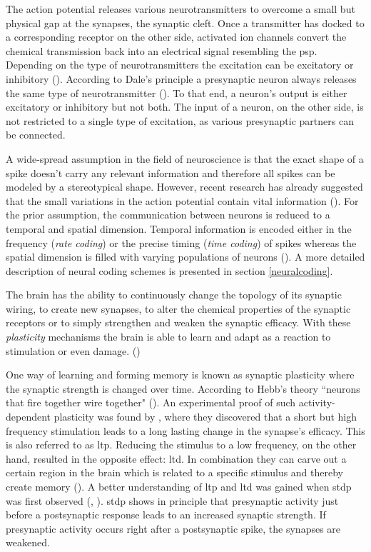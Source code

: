 
The action potential releases various neurotransmitters to overcome a small but physical gap at the synapses, the synaptic cleft. Once a transmitter has docked to a corresponding receptor on the other side, activated ion channels convert the chemical transmission back into an electrical signal resembling the \gls{psp}. Depending on the type of neuro\-transmitters the excitation can be excitatory or inhibitory (\citealp{gerstner2014dynamics}). According to Dale's principle a presynaptic neuron always releases the same type of neurotransmitter (\citealp{dale1935pharmacology}). To that end, a neuron's output is either excitatory or inhibitory but not both. The input of a neuron, on the other side, is not restricted to a single type of excitation, as various presynaptic partners can be connected. 

A wide-spread assumption in the field of neuroscience is that the exact shape of a spike doesn't carry any relevant information and therefore all spikes can be modeled by a stereotypical shape. However, recent research has already suggested that the small variations in the action potential contain vital information (\citealp{debanne2013mechanisms}). For the prior assumption, the communication between neurons is reduced to a temporal and spatial dimension. Temporal information is encoded either in the frequency (\emph{rate coding}) or the precise timing (\emph{time coding}) of spikes whereas the spatial dimension is filled with varying populations of neurons (\citealp{gerstner2014dynamics}). A more detailed description of neural coding schemes is presented in section \ref{neuralcoding}.

The brain has the ability to continuously change the topology of its synaptic wiring, to create new synapses, to alter the chemical properties of the synaptic receptors or to simply strengthen and weaken the synaptic efficacy. With these \emph{plasticity} mechanisms the brain is able to learn and adapt as a reaction to stimulation or even damage. (\citealp{gerstner2014dynamics})

One way of learning and forming memory is known as synaptic plasticity where the synaptic strength is changed over time. According to Hebb's theory ``neurons that fire together wire together" (\citealp{hebb1949organization}). An experimental proof of such activity-dependent plasticity was found by \cite{bliss1973long}, where they discovered that a short but high frequency stimulation leads to a long lasting change in the synapse's efficacy. This is also referred to as \gls{ltp}. Reducing the stimulus to a low frequency, on the other hand, resulted in the opposite effect: \gls{ltd}. In combination they can carve out a certain region in the brain which is related to a specific stimulus and thereby create memory (\citealp{nabavi2014engineering}). A better understanding of \gls{ltp} and \gls{ltd} was gained when \gls{stdp} was first observed (\citealp{markram1997regulation}, \citealp{poo98stdp}). \gls{stdp} shows in principle that presynaptic activity just before a postsynaptic response leads to an increased synaptic strength. If presynaptic activity occurs right after a postsynaptic spike, the synapses are weakened. 

